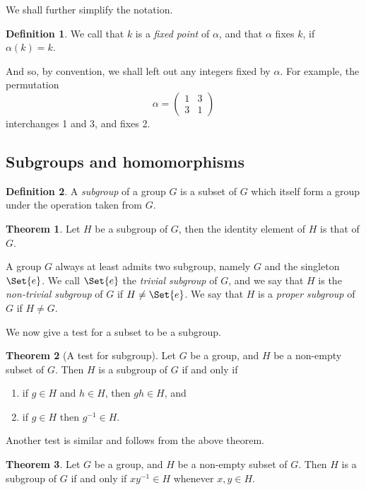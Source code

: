 \documentclass[12pt]{book}
\theoremstyle{definition}
\newtheorem{definition}{Definition}[section]
\newtheorem{theorem}{Theorem}[chapter]
\theoremstyle{remark}
\begin{document}
			We shall further simplify the notation.
			\begin{definition}
				We call that $k$ is a \textit{fixed point}  of $\alpha$, and that $\alpha$ fixes $k$, if $\alpha(k) = k$.
			\end{definition}
			 And so, by convention, we shall left out any integers fixed by $\alpha$. For example, the permutation
			 \begin{equation*}
				 \alpha = \begin{pmatrix}
					 1 & 3 \\
					 3 & 1
				 \end{pmatrix}
			 \end{equation*}
			 interchanges 1 and 3, and fixes 2.
	\subsection{Subgroups and homomorphisms}
		\begin{definition}
			A \textit{subgroup} of a group $G$ is a subset of $G$ which itself form a group under the operation taken from $G$.
		\end{definition}
		\begin{theorem}
			Let $H$ be a subgroup of $G$, then the identity element of $H$ is that of $G$.
		\end{theorem}
	
		A group $G$ always at least admits two subgroup, namely $G$ and the singleton $\Set{e}$. We call $\Set{e}$ the \textit{trivial subgroup} of $G$, and we say that $H$ is the \textit{non-trivial subgroup} of $G$ if $H \neq \Set{e}$. We say that $H$ is a \textit{proper subgroup} of $G$ if $H \neq G$.
		
		We now give a test for a subset to be a subgroup.
		
		\begin{theorem}[A test for subgroup]
			Let $G$ be a group, and $H$ be a non-empty subset of $G$. Then $H$ is a subgroup of $G$ if and only if
			\begin{enumerate}
				\item if $g \in H$ and $h \in H$, then $gh \in H$, and
				\item if $g \in H$ then $g^{-1} \in H$.
			\end{enumerate}
		\end{theorem}
		
		Another test is similar and follows from the above theorem.
		\begin{theorem}
			Let $G$ be a group, and $H$ be a non-empty subset of $G$. Then $H$ is a subgroup of $G$ if and only if $xy^{-1} \in H$ whenever $x,y \in H$.
		\end{theorem}
		
\end{document}
